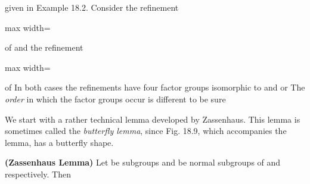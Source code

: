 \documentclass[11pt,oneside]{article}
\begin{document}
\begin{BookBody}
\noindent given in Example 18.2. Consider the refinement

\begin{center}\begin{adjustbox}{max width=\linewidth}\end{adjustbox}\end{center}

\noindent of  and the refinement

\begin{center}\begin{adjustbox}{max width=\linewidth}\end{adjustbox}\end{center}

\noindent of  In both cases the refinements have four factor groups isomorphic to  and  or  The\textit{ order} in which the factor groups occur is different to be sure\BookEnd{\blacktriangle}

We start with a rather technical lemma developed by Zassenhaus. This lemma is sometimes called the\textit{ butterfly lemma}, since Fig. 18.9, which accompanies the lemma, has a butterfly shape.

 \textbf{(Zassenhaus Lemma)} Let  be subgroups and  be normal subgroups of  and  respectively. Then





\end{BookBody}
\end{document}
